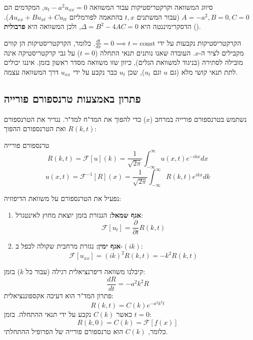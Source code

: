 \begin{notebox}{סיווג המשוואה וקרקטריסטיקות}
    עבור המשוואה $u_t - a^2 u_{xx} = 0$, המקדמים הם $A=-a^2, B=0, C=0$ (עבור המשתנים $t,x$ בהתאמה לפורמליזם $Au_{xx} + Bu_{xt} + Cu_{tt}$).
    הדסקרימיננטה היא $\Delta = B^2 - 4AC = 0$, ולכן המשוואה היא \textbf{פרבולית} ().
    
    הקרקטריסטיקות נקבעות על ידי $\frac{dt}{dx} = 0 \implies t = \text{const}$.
    כלומר, הקרקטריסטיקות הן קווים מקבילים לציר ה-$x$. העובדה שאנו נותנים תנאי התחלה ($t=0$) על גבי קרקטריסטיקה אינה מובילה לסתירה (בניגוד למשוואת הגלים), כיוון שזו משוואה מסדר ראשון בזמן. איננו יכולים לתת תנאי קושי מלא (גם $u$ וגם $u_t$), שכן $u_t$ כבר נקבע על ידי $u_{xx}$ דרך המשוואה עצמה.
\end{notebox}

\subsection{פתרון באמצעות טרנספורם פורייה}
נשתמש בטרנספורם פורייה במרחב ($x$) כדי להפוך את המד"ח למד"ר.
נגדיר את הטרנספורם $R(k,t)$ ואת הטרנספורם ההפוך:
\begin{definitionbox}{טרנספורם פורייה}
    \[ R(k,t) = \mathcal{F}[u](k) = \frac{1}{\sqrt{2\pi}} \int_{-\infty}^{\infty} u(x,t) e^{-ikx} dx \]
    \[ u(x,t) = \mathcal{F}^{-1}[R](x) = \frac{1}{\sqrt{2\pi}} \int_{-\infty}^{\infty} R(k,t) e^{ikx} dk \]
\end{definitionbox}

נפעיל את הטרנספורם על משוואת הדיפוזיה:
\begin{enumerate}
    \item \textbf{אגף שמאל:} הנגזרת בזמן יוצאת מחוץ לאינטגרל:
    \[ \mathcal{F}[u_t] = \frac{\partial}{\partial t} R(k,t) \]
    \item \textbf{אגף ימין:} נגזרת מרחבית שקולה לכפל ב-$(ik)$:
    \[ \mathcal{F}[u_{xx}] = (ik)^2 R(k,t) = -k^2 R(k,t) \]
\end{enumerate}

קיבלנו משוואה דיפרנציאלית רגילה (עבור כל $k$) בזמן:
\begin{equation}
    \frac{dR}{dt} = -a^2 k^2 R
\end{equation}
פתרון המד"ר הוא דעיכה אקספוננציאלית:
\begin{equation}
    R(k,t) = C(k) e^{-a^2 k^2 t}
\end{equation}
כאשר $C(k)$ נקבע על ידי תנאי ההתחלה. בזמן $t=0$:
\[ R(k,0) = C(k) = \mathcal{F}[f(x)] \]
כלומר, $C(k)$ הוא טרנספורם פורייה של הפרופיל ההתחלתי.

